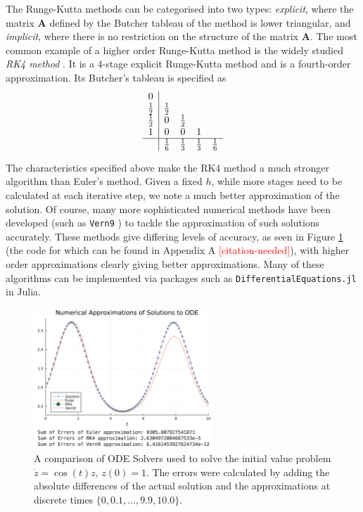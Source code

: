 \documentclass[a4paper,11pt,titlepage]{article}
\newcommand{\citationneeded}{\textcolor{red}{[citation-needed]}}
\theoremstyle{definition}
\theoremstyle{plain}
\theoremstyle{remark}
\begin{document}
The Runge-Kutta methods can be categorised into two types: \textit{explicit}, where the matrix $\mathbf{A}$ defined by the Butcher tableau of the method is lower triangular, and \textit{implicit}, where there is no restriction on the structure of the matrix $\mathbf{A}$. The most common example of a higher order Runge-Kutta method is the widely studied \textit{RK4 method} \cite{rungekuttasolvers}. It is a $4$-stage explicit Runge-Kutta method and is a fourth-order approximation. Its Butcher's tableau is specified as
\begin{equation*}
    \begin{array}{c|cccc}
        0  \\
        \frac{1}{2} & \frac{1}{2} \\
        \frac{1}{2} & 0 & \frac{1}{2} \\
        1 & 0 & 0 & 1 \\
        \hline
        & \frac{1}{6} & \frac{1}{3} & \frac{1}{3} & \frac{1}{6} \\
    \end{array}
\end{equation*}

The characteristics specified above make the RK4 method a much stronger algorithm than Euler's method. Given a fixed $h$, while more stages need to be calculated at each iterative step, we note a much better approximation of the solution. Of course, many more sophisticated numerical methods have been developed (such as \texttt{Vern9} \cite{verner2010}) to tackle the approximation of such solutions accurately. These methods give differing levels of accuracy, as seen in Figure \ref{fig:odesolver} (the code for which can be found in Appendix A \citationneeded), with higher order approximations clearly giving better approximations. Many of these algorithms can be implemented via packages such as \texttt{DifferentialEquations.jl} in Julia.

\begin{figure}
    \centering
    \includegraphics[width=0.6\textwidth]{report/figures/ODESolvers.png}
    \caption{A comparison of ODE Solvers used to solve the initial value problem $\dot{z} = \cos(t)z$, $z(0) = 1$. The errors were calculated by adding the absolute differences of the actual solution and the approximations at discrete times $\{0, 0.1, \dots, 9.9, 10.0\}$.}
    \label{fig:odesolver}
\end{figure}
\end{document}

